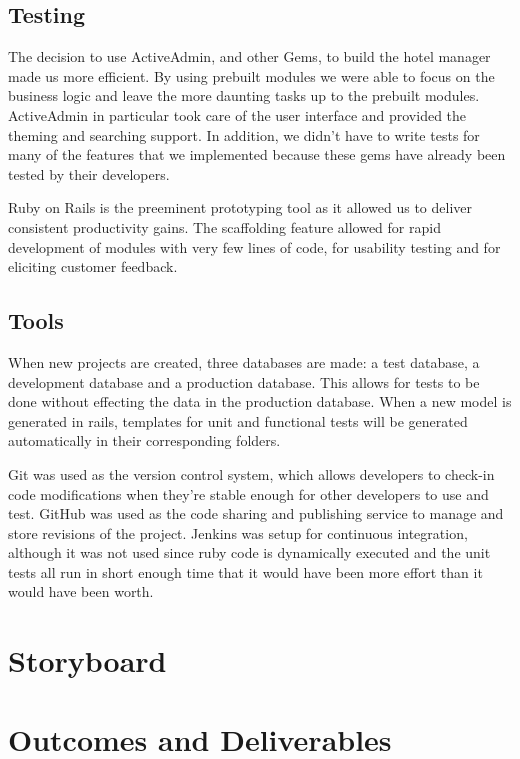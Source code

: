 \documentclass[12pt]{elsarticle}
\begin{document}
\subsection{Testing}

The decision to use ActiveAdmin, and other Gems, to build the hotel manager made us more efficient. By using prebuilt modules we were able to focus on the business logic and leave the more daunting tasks up to the prebuilt modules. ActiveAdmin in particular took care of the user interface and provided the theming and searching support. In addition, we didn't have to write tests for many of the features that we implemented because these gems have already been tested by their developers.

Ruby on Rails is the preeminent prototyping tool as it allowed us to deliver consistent productivity gains. The scaffolding feature allowed for rapid development of modules with very few lines of code, for usability testing and for eliciting customer feedback.

\subsection{Tools}

When new projects are created, three databases are made: a test database, a development database and a production database. This allows for tests to be done without effecting the data in the production database. When a new model is generated in rails, templates for unit and functional tests will be generated automatically in their corresponding folders. 

Git was used as the version control system, which allows developers to check-in code modifications when they're stable enough for other developers to use and test. GitHub was used as the code sharing and publishing service to manage and store revisions of the project. Jenkins was setup for continuous integration, although it was not used since ruby code is dynamically executed and the unit tests all run in short enough time that it would have been more effort than it would have been worth.
\section{Storyboard}

\section{Outcomes and Deliverables}
\end{document}
